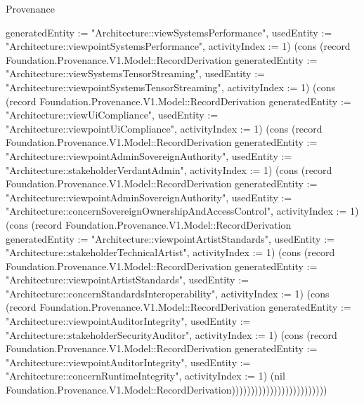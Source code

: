 \begin{lexlean}{Provenance}
\begin{semanticmodule}
{{generatedEntity := "Architecture::viewSystemsPerformance", usedEntity := "Architecture::viewpointSystemsPerformance", activityIndex := 1}) (cons (record Foundation.Provenance.V1.Model::RecordDerivation {generatedEntity := "Architecture::viewSystemsTensorStreaming", usedEntity := "Architecture::viewpointSystemsTensorStreaming", activityIndex := 1}) (cons (record Foundation.Provenance.V1.Model::RecordDerivation {generatedEntity := "Architecture::viewUiCompliance", usedEntity := "Architecture::viewpointUiCompliance", activityIndex := 1}) (cons (record Foundation.Provenance.V1.Model::RecordDerivation {generatedEntity := "Architecture::viewpointAdminSovereignAuthority", usedEntity := "Architecture::stakeholderVerdantAdmin", activityIndex := 1}) (cons (record Foundation.Provenance.V1.Model::RecordDerivation {generatedEntity := "Architecture::viewpointAdminSovereignAuthority", usedEntity := "Architecture::concernSovereignOwnershipAndAccessControl", activityIndex := 1}) (cons (record Foundation.Provenance.V1.Model::RecordDerivation {generatedEntity := "Architecture::viewpointArtistStandards", usedEntity := "Architecture::stakeholderTechnicalArtist", activityIndex := 1}) (cons (record Foundation.Provenance.V1.Model::RecordDerivation {generatedEntity := "Architecture::viewpointArtistStandards", usedEntity := "Architecture::concernStandardsInteroperability", activityIndex := 1}) (cons (record Foundation.Provenance.V1.Model::RecordDerivation {generatedEntity := "Architecture::viewpointAuditorIntegrity", usedEntity := "Architecture::stakeholderSecurityAuditor", activityIndex := 1}) (cons (record Foundation.Provenance.V1.Model::RecordDerivation {generatedEntity := "Architecture::viewpointAuditorIntegrity", usedEntity := "Architecture::concernRuntimeIntegrity", activityIndex := 1}) (nil Foundation.Provenance.V1.Model::RecordDerivation)))))))))))))))))))))))))
}


\end{semanticmodule}
\end{lexlean}
